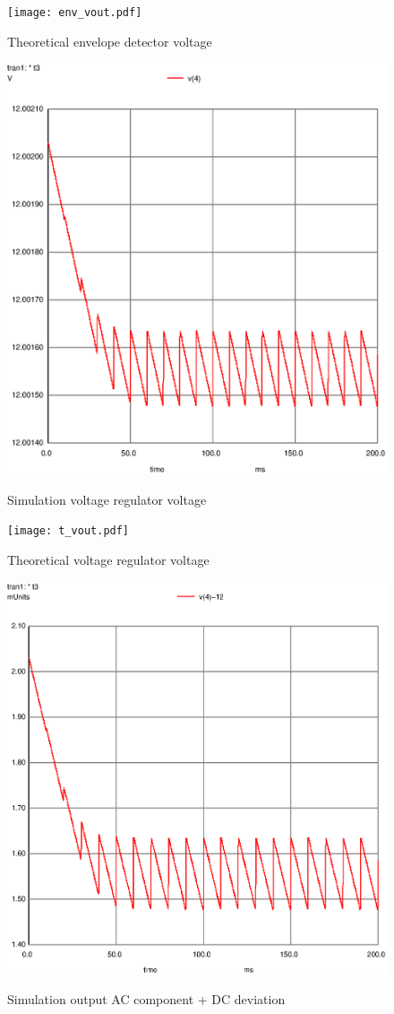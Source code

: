 \begin{figure}[!ht] \centering
\caption{Theoretical envelope detector voltage}
\squeezeup 
\squeezeup 
\squeezeup 
\squeezeup 
\squeezeup 
\squeezeup 
\squeezeup 
\squeezeup 
\texttt{[image: env\_vout.pdf]}
\label{fig:theo1}
\end{figure}

\begin{figure}[!ht] \centering
\caption{Simulation voltage regulator voltage}
\includegraphics[width=0.6\linewidth]{vout.eps}
\label{fig:sim2}
\end{figure}


\begin{figure}[!ht] \centering
\caption{Theoretical voltage regulator voltage}
\squeezeup 
\squeezeup 
\squeezeup 
\squeezeup 
\squeezeup 
\squeezeup 
\squeezeup 
\squeezeup 
\texttt{[image: t\_vout.pdf]}
\label{fig:theo2}
\end{figure}

\begin{figure}[!ht] \centering
\caption{Simulation output AC component + DC deviation}
\includegraphics[width=0.6\linewidth]{vout(ac+dc).eps}
\label{fig:sim3}
\end{figure}

